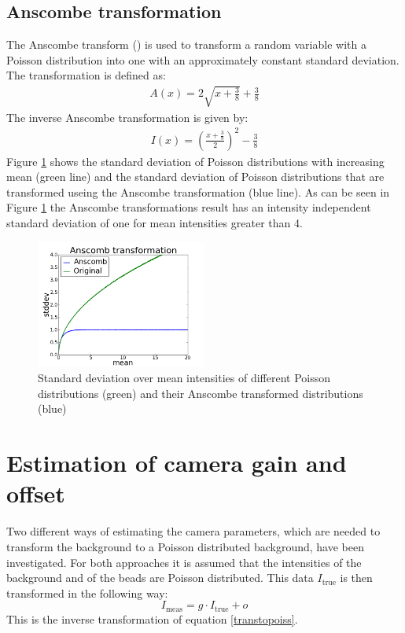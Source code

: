 \subsection{Anscombe transformation}
\label{trafoAnscombe}
The Anscombe transform (\cite{anscombe}) is used to transform a random variable with a Poisson
distribution into one with an approximately constant standard deviation. The
transformation is defined as:
\begin{align}
	A(x) = 2\sqrt{x+\frac{3}{8}} + \frac{3}{8}
\end{align}
The inverse Anscombe transformation is given by:
\begin{align}
	I(x) = \left(\frac{x+\frac{3}{8}}{2}\right)^2 - \frac{3}{8} \label{invAnsc}
\end{align}
Figure \ref{anscombe} shows the standard deviation of Poisson distributions with increasing mean (green line) and the standard deviation of Poisson distributions that are transformed useing the Anscombe transformation (blue line). As can be seen in Figure \ref{anscombe} the Anscombe transformations result has
an intensity independent standard deviation of one for mean intensities greater than 4.
\begin{figure}
	\centering
	\includegraphics[width = 0.5\textwidth]{pictures/anscombe.png}
	\caption{Standard deviation over mean intensities of different Poisson
	distributions (green) and their Anscombe transformed distributions (blue)}
	\label{anscombe}	
\end{figure}
 

\section{Estimation of camera gain and offset}\label{estimationCameraGain}
Two different ways of estimating the camera parameters, which are needed to transform the background to a Poisson distributed background, have been investigated. For both approaches it is assumed that the intensities of the background and of the beads are Poisson distributed. This data $I_\text{true}$ is then transformed in the following way:
\begin{equation}
	I_\text{meas} = g \cdot I_\text{true} + o \label{trafoGain}
\end{equation}
This is the inverse transformation of equation \ref{transtopoiss}.
